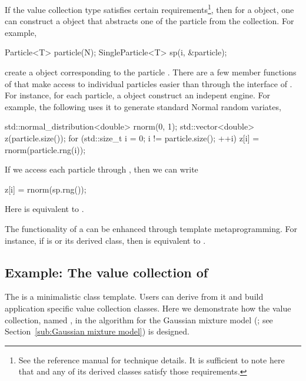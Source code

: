 If the value collection type  satisfies certain
requirements\footnote{See the reference manual for technique details. It is
  sufficient to note here that  and any of its derived
  classes satisfy those requirements.}, then for a 
object, one can construct a  object that
abstracts one of the particle from the collection. For example,
\begin{cppcode}
Particle<T> particle(N);
SingleParticle<T> sp(i, &particle);
\end{cppcode}
create a  object corresponding to the particle
. There are a few member functions of
 that make access to individual particles easier
than through the interface of . For instance, for each
particle, a  object construct an indepent \cppoo{} \rng
engine. For example, the following uses it to generate standard Normal random
variates,
\begin{cppcode}
std::normal_distribution<double> rnorm(0, 1);
std::vector<double> z(particle.size());
for (std::size_t i = 0; i != particle.size(); ++i)
    z[i] = rnorm(particle.rng(i));
\end{cppcode}
If we access each particle through , then we can
write
\begin{cppcode}
z[i] = rnorm(sp.rng());
\end{cppcode}
Here  is equivalent to .

The functionality of a  can be enhanced through
template metaprogramming. For instance, if  is
 or its derived class, then  is
equivalent to .

\subsection{Example: The value collection of \protect\gmm}
\label{sub:Example: The value collection of gmm}

The  is a minimalistic class template. Users can derive
from it and build application specific value collection classes. Here we
demonstrate how the value collection, named , in the \smc[2]
algorithm for the Gaussian mixture model (\gmm; see Section~\ref{sub:Gaussian
  mixture model}) is designed.

